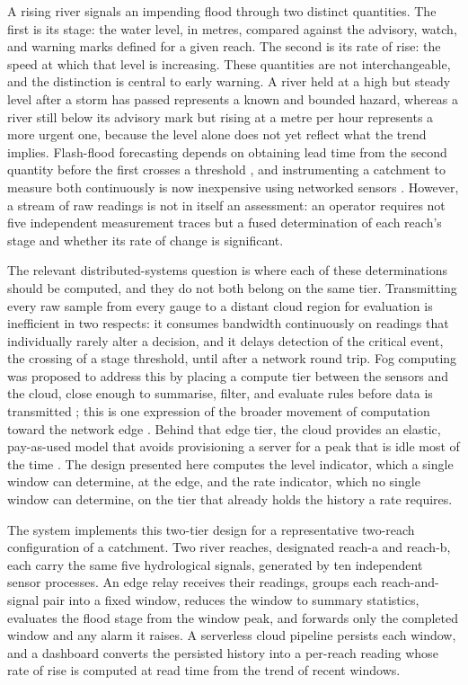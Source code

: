 \documentclass[conference]{IEEEtran}
\begin{document}
A rising river signals an impending flood through two distinct quantities. The first is its stage: the water level, in metres, compared against the advisory, watch, and warning marks defined for a given reach. The second is its rate of rise: the speed at which that level is increasing. These quantities are not interchangeable, and the distinction is central to early warning. A river held at a high but steady level after a storm has passed represents a known and bounded hazard, whereas a river still below its advisory mark but rising at a metre per hour represents a more urgent one, because the level alone does not yet reflect what the trend implies. Flash-flood forecasting depends on obtaining lead time from the second quantity before the first crosses a threshold \cite{hapuarachchi2011, krzysztofowicz2001}, and instrumenting a catchment to measure both continuously is now inexpensive using networked sensors \cite{basha2007, atzori2010}. However, a stream of raw readings is not in itself an assessment: an operator requires not five independent measurement traces but a fused determination of each reach's stage and whether its rate of change is significant.

The relevant distributed-systems question is where each of these determinations should be computed, and they do not both belong on the same tier. Transmitting every raw sample from every gauge to a distant cloud region for evaluation is inefficient in two respects: it consumes bandwidth continuously on readings that individually rarely alter a decision, and it delays detection of the critical event, the crossing of a stage threshold, until after a network round trip. Fog computing was proposed to address this by placing a compute tier between the sensors and the cloud, close enough to summarise, filter, and evaluate rules before data is transmitted \cite{bonomi2012, yousefpour2019}; this is one expression of the broader movement of computation toward the network edge \cite{shi2016, satyanarayanan2017}. Behind that edge tier, the cloud provides an elastic, pay-as-used model that avoids provisioning a server for a peak that is idle most of the time \cite{armbrust2010}. The design presented here computes the level indicator, which a single window can determine, at the edge, and the rate indicator, which no single window can determine, on the tier that already holds the history a rate requires.

The system implements this two-tier design for a representative two-reach configuration of a catchment. Two river reaches, designated reach-a and reach-b, each carry the same five hydrological signals, generated by ten independent sensor processes. An edge relay receives their readings, groups each reach-and-signal pair into a fixed window, reduces the window to summary statistics, evaluates the flood stage from the window peak, and forwards only the completed window and any alarm it raises. A serverless cloud pipeline persists each window, and a dashboard converts the persisted history into a per-reach reading whose rate of rise is computed at read time from the trend of recent windows.
\end{document}
